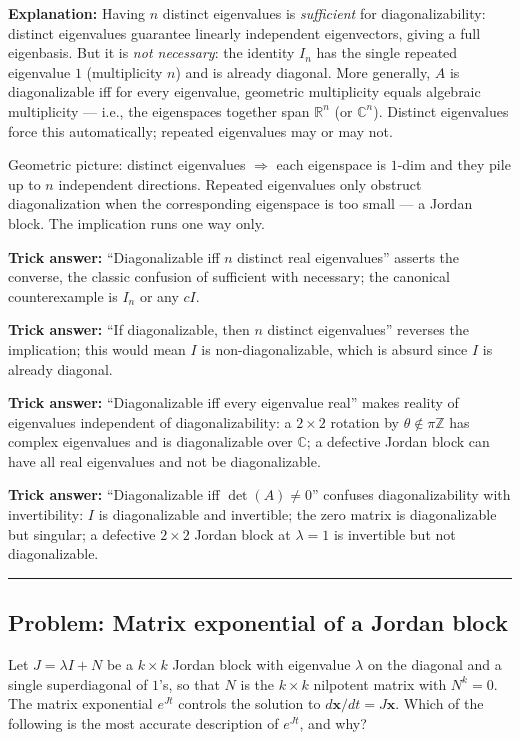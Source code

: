 \documentclass[12pt]{amsart}
\newcommand{\divider}{
  \vspace{-1em}
  \noindent
  \raisebox{-0.15ex}{\textbullet}%
  \hspace{0.5em}%
  \rule[0.5ex]{0.95\textwidth}{1.0pt}%
  \hspace{0.5em}%
  \raisebox{-0.15ex}{\textbullet}%
  \vspace{0em}
}
\begin{document}
\textbf{Explanation:}
Having $n$ distinct eigenvalues is \emph{sufficient} for diagonalizability:
distinct eigenvalues guarantee linearly independent eigenvectors, giving a
full eigenbasis. But it is \emph{not necessary}: the identity $I_n$ has
the single repeated eigenvalue $1$ (multiplicity $n$) and is already
diagonal. More generally, $A$ is diagonalizable iff for every eigenvalue,
geometric multiplicity equals algebraic multiplicity --- i.e., the
eigenspaces together span $\mathbb{R}^n$ (or $\mathbb{C}^n$). Distinct
eigenvalues force this automatically; repeated eigenvalues may or may not.

Geometric picture: distinct eigenvalues $\Rightarrow$ each eigenspace is
$1$-dim and they pile up to $n$ independent directions. Repeated
eigenvalues only obstruct diagonalization when the corresponding eigenspace
is too small --- a Jordan block. The implication runs one way only.

\textbf{Trick answer:}
``Diagonalizable iff $n$ distinct real eigenvalues'' asserts the converse,
the classic confusion of sufficient with necessary; the canonical
counterexample is $I_n$ or any $cI$.

\textbf{Trick answer:}
``If diagonalizable, then $n$ distinct eigenvalues'' reverses the
implication; this would mean $I$ is non-diagonalizable, which is absurd
since $I$ is already diagonal.

\textbf{Trick answer:}
``Diagonalizable iff every eigenvalue real'' makes reality of eigenvalues
independent of diagonalizability: a $2 \times 2$ rotation by
$\theta \notin \pi\mathbb{Z}$ has complex eigenvalues and is diagonalizable
over $\mathbb{C}$; a defective Jordan block can have all real eigenvalues
and not be diagonalizable.

\textbf{Trick answer:}
``Diagonalizable iff $\det(A) \neq 0$'' confuses diagonalizability with
invertibility: $I$ is diagonalizable and invertible; the zero matrix is
diagonalizable but singular; a defective $2\times 2$ Jordan block at
$\lambda = 1$ is invertible but not diagonalizable.

\divider

\subsection*{Problem: Matrix exponential of a Jordan block}

Let $J = \lambda I + N$ be a $k \times k$ Jordan block with eigenvalue
$\lambda$ on the diagonal and a single superdiagonal of $1$'s, so that $N$
is the $k \times k$ nilpotent matrix with $N^k = 0$. The matrix exponential
$e^{Jt}$ controls the solution to $d\mathbf{x}/dt = J\mathbf{x}$. Which of
the following is the most accurate description of $e^{Jt}$, and why?
\end{document}
